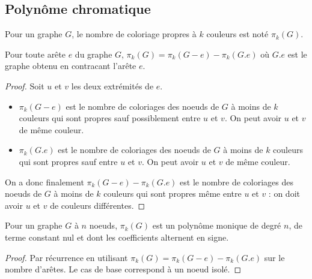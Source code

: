 \subsection{Polynôme chromatique}
Pour un graphe $G$, le nombre de coloriage propres à $k$ couleurs est noté $\pi_k(G)$.
\begin{mytheo}
  Pour toute arête $e$ du graphe $G$, $\pi_k(G) = \pi_k(G-e) - \pi_k(G.e)$ où $G.e$ est le graphe obtenu en contracant l'arête $e$.
  \begin{proof}
  Soit $u$ et $v$ les deux extrémités de $e$.
	\begin{itemize}
	\item $\pi_k(G-e)$ est le nombre de coloriages des noeuds de $G$ à moins de $k$ couleurs qui sont propres sauf possiblement entre $u$ et $v$. On peut avoir $u$ et $v$ de même couleur.
	\item $\pi_k(G.e)$ est le nombre de coloriages des noeuds de $G$ à moins de $k$ couleurs qui sont propres sauf entre $u$ et $v$. On peut avoir $u$ et $v$ de même couleur.
	\end{itemize}
	On a donc finalement $\pi_k(G-e) - \pi_k(G.e)$ est le nombre de coloriages des noeuds de $G$ à moins de $k$ couleurs qui sont propres même entre $u$ et $v$ : on doit avoir $u$ et $v$ de couleurs différentes.
  \end{proof}
\end{mytheo}

\begin{mycorr} [Birkhoff]
  Pour un graphe $G$ à $n$ noeuds, $\pi_k (G)$ est un polynôme monique de degré $n$, de terme constant nul et dont les coefficients alternent en signe.
  \begin{proof}
    Par récurrence en utilisant $\pi_k(G) = \pi_k(G-e)-\pi_k(G.e)$ sur le nombre d'arêtes. Le cas de base correspond à un noeud isolé.
  \end{proof}
\end{mycorr}
